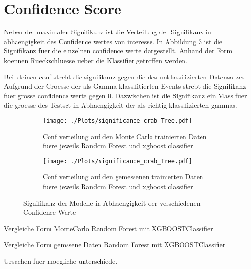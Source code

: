 \section{Confidence Score}
Neben der maximalen Signifikanz ist die Verteilung der Signifikanz in abhaengigkeit des Confidence wertes von interesse. 
In Abbildung \ref{fig:signconf} ist die Signifikanz fuer die einzelnen confidence werte dargestellt. 
Anhand der Form koennen Rueckschluesse ueber die Klassifier getroffen werden. 

Bei kleinen conf strebt die signifikanz gegen die des unklassifizierten Datensatzes.
Aufgrund der Groesse der als Gamma klassifitierten Events strebt die Signifikanz fuer grosse confidence werte gegen 0.
Dazwischen ist die Signifikanz ein Mass fuer die groesse des Testset in Abhaengigkeit der als richtig klassifizierten gammas.
\begin{figure}[H]
  \centering
  \begin{subfigure}[b]{0.48\textwidth}
  \centering
  \texttt{[image: ./Plots/significance\_crab\_Tree.pdf]}
  \caption{Conf verteilung auf den Monte Carlo trainierten Daten fuere jeweils Random Forest und xgboost classifier}
  \label{fig:signconfMC}
\end{subfigure}
\begin{subfigure}[b]{0.48\textwidth}
  \centering
  \texttt{[image: ./Plots/significance\_crab\_Tree.pdf]}
  \caption{Conf verteilung auf den gemessenen trainierten Daten fuere jeweils Random Forest und xgboost classifier}
  \label{fig:signconfMESS}
\end{subfigure}
\caption{Signifikanz der Modelle in Abhaengigkeit der verschiedenen Confidence Werte}
\label{fig:signconf}
\end{figure}

Vergleiche Form MonteCarlo Random Forest mit XGBOOSTClassifier 

Vergleiche Form gemssene Daten Random Forest mit XGBOOSTClassifier 

Ursachen fuer moegliche unterschiede.

